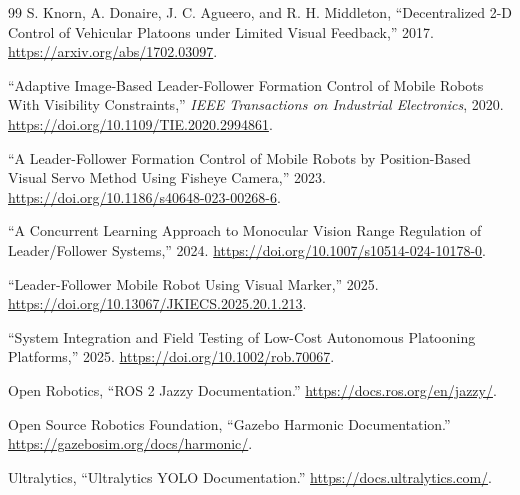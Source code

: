 \documentclass[11pt,oneside,openany]{book}
\begin{document}
\begin{thebibliography}{99}
S. Knorn, A. Donaire, J. C. Agueero, and R. H. Middleton,
``Decentralized 2-D Control of Vehicular Platoons under Limited Visual Feedback,'' 2017.
\url{https://arxiv.org/abs/1702.03097}.

``Adaptive Image-Based Leader-Follower Formation Control of Mobile Robots With Visibility Constraints,''
\emph{IEEE Transactions on Industrial Electronics}, 2020.
\url{https://doi.org/10.1109/TIE.2020.2994861}.

``A Leader-Follower Formation Control of Mobile Robots by Position-Based Visual Servo Method Using Fisheye Camera,'' 2023.
\url{https://doi.org/10.1186/s40648-023-00268-6}.

``A Concurrent Learning Approach to Monocular Vision Range Regulation of Leader/Follower Systems,'' 2024.
\url{https://doi.org/10.1007/s10514-024-10178-0}.

``Leader-Follower Mobile Robot Using Visual Marker,'' 2025.
\url{https://doi.org/10.13067/JKIECS.2025.20.1.213}.

``System Integration and Field Testing of Low-Cost Autonomous Platooning Platforms,'' 2025.
\url{https://doi.org/10.1002/rob.70067}.

Open Robotics, ``ROS 2 Jazzy Documentation.''
\url{https://docs.ros.org/en/jazzy/}.

Open Source Robotics Foundation, ``Gazebo Harmonic Documentation.''
\url{https://gazebosim.org/docs/harmonic/}.

Ultralytics, ``Ultralytics YOLO Documentation.''
\url{https://docs.ultralytics.com/}.
\end{thebibliography}

\printindex
\end{document}

